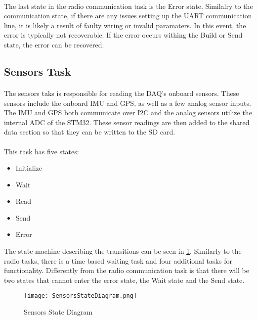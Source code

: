 \paragraph{}
The last state in the radio communication task is the Error state.
Similalry to the communication state, if there are any issues setting up the UART communication line, it is likely a result of faulty wiring or invalid paramaters.
In this event, the error is typically not recoverable.
If the error occurs withing the Build or Send state, the error can be recovered.


\subsection{Sensors Task}

\paragraph{}
The sensors taks is responsible for reading the DAQ's onboard sensors.
These sensors include the onboard IMU and GPS, as well as a few analog sensor inputs.
The IMU and GPS both communicate over I2C and the analog sensors utilize the internal ADC of the STM32.
These sensor readings are then added to the shared data section so that they can be written to the SD card.

\paragraph{}
This task has five states:
\begin{itemize}
	\item Initialize
	\item Wait
	\item Read
	\item Send
	\item Error
\end{itemize}
The state machine describing the transitions can be seen in \cref{fig:SensorsDiagram}.
Similarly to the radio tasks, there is a time based waiting task and four additional tasks for functionality.
Differently from the radio communication task is that there will be two states that cannot enter the error state, the Wait state and the Send state.

\begin{figure}[H]
	\centering
	\texttt{[image: SensorsStateDiagram.png]}
	\caption{Sensors State Diagram}
	\label{fig:SensorsDiagram}
\end{figure}

